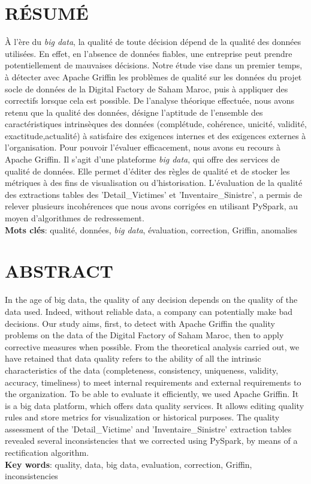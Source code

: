 \cleardoublepage
{}
{}
\section*{R\'ESUM\'E}

\`A l'\`ere du \textit{big data}, la qualité de toute décision dépend de la qualité des données utilisées. En effet, en l’absence de données fiables, une entreprise peut prendre potentiellement de mauvaises décisions. Notre \'etude vise dans un premier temps, \`a d\'etecter avec Apache Griffin les probl\`emes de qualit\'e sur les donn\'ees du projet socle de donn\'ees de la Digital Factory de Saham Maroc, puis \`a appliquer des correctifs lorsque cela est possible. De l'analyse th\'eorique effectu\'ee, nous avons retenu que la qualité des données, désigne l’aptitude de l’ensemble des caractéristiques intrinsèques des données (compl\'etude, cohérence, unicité, validit\'e, exactitude,actualit\'e) à satisfaire des exigences internes et des exigences externes à l’organisation. Pour pouvoir l'\'evaluer efficacement, nous avons eu recours \`a Apache Griffin. Il s'agit d'une plateforme \textit{big data}, qui offre des services de qualit\'e de donn\'ees. Elle permet d'\'editer des r\`egles de qualit\'e et de stocker les m\'etriques \`a des fins de visualisation ou d'historisation. L'\'evaluation de la qualit\'e des  extractions tables des 'Detail\_Victimes' et 'Inventaire\_Sinistre', a permis de relever plusieurs incoh\'erences que nous avons corrigées en utilisant PySpark, au moyen d'algorithmes de redressement.\\
\textbf{Mots cl\'es}: qualit\'e, donn\'ees, \textit{big data}, \'evaluation, correction, Griffin, anomalies
\section*{ABSTRACT}

In the age of big data, the quality of any decision depends on the quality of the data used. Indeed, without reliable data, a company can potentially make bad decisions. Our study aims, first, to detect with Apache Griffin the quality problems on the data of the Digital Factory of Saham Maroc, then to apply corrective measures when possible. From the theoretical analysis carried out, we have retained that data quality refers to the ability of all the intrinsic characteristics of the data (completeness, consistency, uniqueness, validity, accuracy, timeliness) to meet internal requirements and external requirements to the organization. To be able to evaluate it efficiently, we used Apache Griffin. It is a big data platform, which offers data quality services. It allows editing quality rules and store metrics for visualization or historical purposes. The quality assessment of the 'Detail\_Victime' and 'Inventaire\_Sinistre' extraction tables revealed several inconsistencies that we corrected using PySpark, by means of a rectification algorithm.\\
\textbf{Key words}: quality, data, big data, evaluation, correction, Griffin, inconsistencies